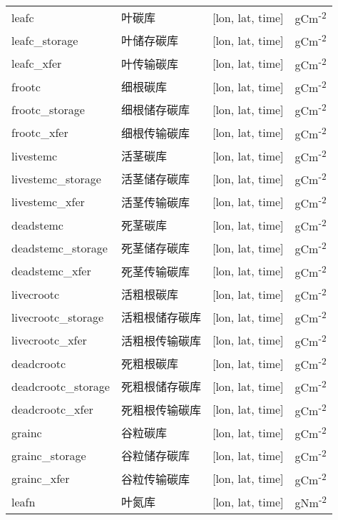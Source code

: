 \documentclass[a4paper,12pt,twoside]{article}
\begin{document}
\begin{longtable}[htbp]{lp{}ll}
\bottomrule
\endfoot
\bottomrule
\endlastfoot
leafc & 叶碳库 & {[}lon, lat, time{]} & gCm\textsuperscript{-2} \\
leafc\_storage & 叶储存碳库 & {[}lon, lat, time{]}  & gCm\textsuperscript{-2} \\
leafc\_xfer & 叶传输碳库 & {[}lon, lat, time{]}  & gCm\textsuperscript{-2} \\
frootc & 细根碳库 & {[}lon, lat, time{]}  & gCm\textsuperscript{-2} \\
frootc\_storage& 细根储存碳库 & {[}lon, lat, time{]} & gCm\textsuperscript{-2} \\
frootc\_xfer & 细根传输碳库 & {[}lon, lat, time{]} & gCm\textsuperscript{-2} \\
livestemc & 活茎碳库 & {[}lon, lat, time{]}  & gCm\textsuperscript{-2} \\
livestemc\_storage & 活茎储存碳库 & {[}lon, lat, time{]} & gCm\textsuperscript{-2} \\
livestemc\_xfer & 活茎传输碳库 & {[}lon, lat, time{]} & gCm\textsuperscript{-2} \\
deadstemc & 死茎碳库 & {[}lon, lat, time{]}  & gCm\textsuperscript{-2} \\
deadstemc\_storage  & 死茎储存碳库 & {[}lon, lat, time{]} & gCm\textsuperscript{-2} \\
deadstemc\_xfer & 死茎传输碳库 & {[}lon, lat, time{]} & gCm\textsuperscript{-2} \\
livecrootc & 活粗根碳库 & {[}lon, lat, time{]}  & gCm\textsuperscript{-2} \\
livecrootc\_storage & 活粗根储存碳库 & {[}lon, lat, time{]} & gCm\textsuperscript{-2} \\
livecrootc\_xfer   & 活粗根传输碳库 & {[}lon, lat, time{]} & gCm\textsuperscript{-2} \\
deadcrootc     & 死粗根碳库 & {[}lon, lat, time{]}  & gCm\textsuperscript{-2} \\
deadcrootc\_storage & 死粗根储存碳库 & {[}lon, lat, time{]}  & gCm\textsuperscript{-2} \\
deadcrootc\_xfer   & 死粗根传输碳库 & {[}lon, lat, time{]} & gCm\textsuperscript{-2} \\
grainc       & 谷粒碳库 & {[}lon, lat, time{]}  & gCm\textsuperscript{-2} \\
grainc\_storage   & 谷粒储存碳库 & {[}lon, lat, time{]} & gCm\textsuperscript{-2} \\
grainc\_xfer     & 谷粒传输碳库 & {[}lon, lat, time{]} & gCm\textsuperscript{-2} \\
leafn        & 叶氮库 & {[}lon, lat, time{]}  & gNm\textsuperscript{-2} \\

\end{longtable}
\end{document}
